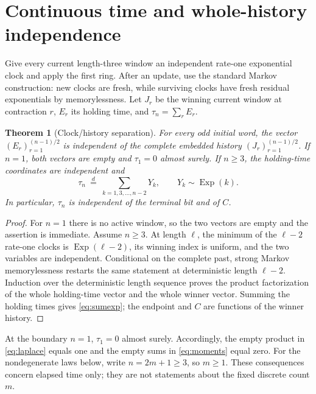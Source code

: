 \documentclass[10pt,a4paper]{amsart}
\newtheorem{theorem}{Theorem}[section]
\theoremstyle{remark}
\newcommand{\Exp}{\operatorname{Exp}}
\newcommand{\1}{\mathbf 1}
\begin{document}
\section{Continuous time and whole-history independence}

Give every current length-three window an independent rate-one exponential
clock and apply the first ring.  After an update, use the standard Markov
construction: new clocks are fresh, while surviving clocks have fresh
residual exponentials by memorylessness.  Let $J_r$ be the winning current
window at contraction $r$, $E_r$ its holding time, and $\tau_n=\sum_rE_r$.

\begin{theorem}[Clock/history separation]\label{thm:independence}
For every odd initial word, the vector $(E_r)_{r=1}^{(n-1)/2}$ is independent
of the complete embedded history $(J_r)_{r=1}^{(n-1)/2}$.  If $n=1$, both
vectors are empty and $\tau_1=0$ almost surely.  If $n\geq3$, the holding-time
coordinates are independent and
\begin{equation}\label{eq:sumexp}
 \tau_n\ \stackrel d=\
 \sum_{k=1,3,\ldots,n-2}Y_k,\qquad Y_k\sim\Exp(k).
\end{equation}
In particular, $\tau_n$ is independent of the terminal bit and of $C$.
\end{theorem}

\begin{proof}
For $n=1$ there is no active window, so the two vectors are empty and the
assertion is immediate.  Assume $n\geq3$.
At length $\ell$, the minimum of the $\ell-2$ rate-one clocks is
$\Exp(\ell-2)$, its winning index is uniform, and the two variables are
independent.  Conditional on the complete past, strong Markov memorylessness
restarts the same statement at deterministic length $\ell-2$.  Induction over
the deterministic length sequence proves the product factorization of the
whole holding-time vector and the whole winner vector.  Summing the holding
times gives \eqref{eq:sumexp}; the endpoint and $C$ are functions of the
winner history.
\end{proof}

At the boundary $n=1$, $\tau_1=0$ almost surely.  Accordingly, the empty
product in \eqref{eq:laplace} equals one and the empty sums in
\eqref{eq:moments} equal zero.  For the nondegenerate laws below, write
$n=2m+1\geq3$, so $m\geq1$.  These consequences concern elapsed time only;
they are not statements about the fixed discrete count $m$.
\end{document}
